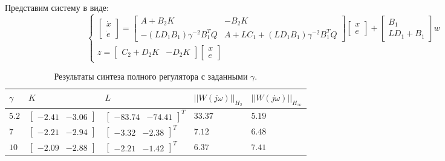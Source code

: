 Представим систему в виде:
\begin{equation}
    \begin{cases}
        \begin{bmatrix}
            \dot{x} \\ \dot{e}
        \end{bmatrix} =
        \begin{bmatrix}
            A + B_2K & -B_2K \\
            -(LD_1B_1)\gamma^{-2}B_1^TQ & A + LC_1 + (LD_1B_1)\gamma^{-2}B_1^TQ
        \end{bmatrix} \begin{bmatrix}
            x \\ e
        \end{bmatrix} +
        \begin{bmatrix}
            B_1 \\
            LD_1 + B_1
        \end{bmatrix}w \\
        z = \begin{bmatrix}
            C_2 +D_2K & -D_2K
        \end{bmatrix}\begin{bmatrix}
            x \\ e
        \end{bmatrix}
    \end{cases}
\end{equation}

\begin{table}[h!]
    \centering
    \begin{tabular}{| l | l | l | l | l |} 
        \hline
        $\gamma$ & $K$ & $L$ & $||W(j\omega)||_{H_2}$ & $||W(j\omega)||_{H_\infty}$ \\  
        \hline\hline
        $5.2$ & $\begin{bmatrix} -2.41 & -3.06 \end{bmatrix}$ & $\begin{bmatrix} -83.74 & -74.41 \end{bmatrix}^T$ & $33.37$ & $5.19$ \\ 
        \hline
        $7$ & $\begin{bmatrix} -2.21 & -2.94 \end{bmatrix}$ & $\begin{bmatrix} -3.32 & -2.38 \end{bmatrix}^T$ & $7.12$ & $6.48$ \\
        \hline
        $10$ & $\begin{bmatrix} -2.09 & -2.88 \end{bmatrix}$ & $\begin{bmatrix} -2.21 & -1.42 \end{bmatrix}^T$ & $6.37$ & $7.41$ \\
        \hline
       \end{tabular}
    \caption{Результаты синтеза полного регулятора с заданными $\gamma$.}
    \label{table:2}
\end{table}


